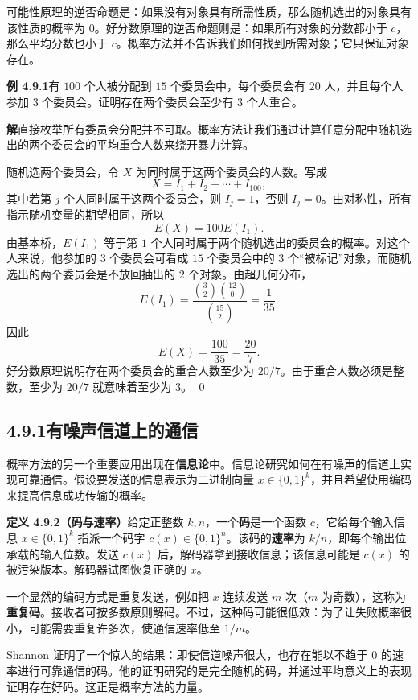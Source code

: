 \documentclass[UTF8,12pt,a4paper,fontset=fandol]{ctexart}
\begin{document}
可能性原理的逆否命题是：如果没有对象具有所需性质，那么随机选出的对象具有该性质的概率为 $0$。好分数原理的逆否命题则是：如果所有对象的分数都小于 $c$，那么平均分数也小于 $c$。概率方法并不告诉我们如何找到所需对象；它只保证对象存在。

\noindent\textbf{例 4.9.1}\quad 有 $100$ 个人被分配到 $15$ 个委员会中，每个委员会有 $20$ 人，并且每个人参加 $3$ 个委员会。证明存在两个委员会至少有 $3$ 个人重合。

\noindent\textbf{解}\quad 直接枚举所有委员会分配并不可取。概率方法让我们通过计算任意分配中随机选出的两个委员会的平均重合人数来绕开暴力计算。

随机选两个委员会，令 $X$ 为同时属于这两个委员会的人数。写成
\[
  X=I_1+I_2+\cdots+I_{100},
\]
其中若第 $j$ 个人同时属于这两个委员会，则 $I_j=1$，否则 $I_j=0$。由对称性，所有指示随机变量的期望相同，所以
\[
  E(X)=100E(I_1).
\]
由基本桥，$E(I_1)$ 等于第 $1$ 个人同时属于两个随机选出的委员会的概率。对这个人来说，他参加的 $3$ 个委员会可看成 $15$ 个委员会中的 $3$ 个“被标记”对象，而随机选出的两个委员会是不放回抽出的 $2$ 个对象。由超几何分布，
\[
  E(I_1)=\frac{\binom{3}{2}\binom{12}{0}}{\binom{15}{2}}=\frac{1}{35}.
\]
因此
\[
  E(X)=\frac{100}{35}=\frac{20}{7}.
\]
好分数原理说明存在两个委员会的重合人数至少为 $20/7$。由于重合人数必须是整数，至少为 $20/7$ 就意味着至少为 $3$。 \qed

\subsection*{4.9.1\quad 有噪声信道上的通信}

概率方法的另一个重要应用出现在\textbf{信息论}中。信息论研究如何在有噪声的信道上实现可靠通信。假设要发送的信息表示为二进制向量 $x\in\{0,1\}^k$，并且希望使用编码来提高信息成功传输的概率。

\noindent\textbf{定义 4.9.2（码与速率）}\quad 给定正整数 $k,n$，一个\textbf{码}是一个函数 $c$，它给每个输入信息 $x\in\{0,1\}^k$ 指派一个码字 $c(x)\in\{0,1\}^n$。该码的\textbf{速率}为 $k/n$，即每个输出位承载的输入位数。发送 $c(x)$ 后，解码器拿到接收信息；该信息可能是 $c(x)$ 的被污染版本。解码器试图恢复正确的 $x$。

一个显然的编码方式是重复发送，例如把 $x$ 连续发送 $m$ 次（$m$ 为奇数），这称为\textbf{重复码}。接收者可按多数原则解码。不过，这种码可能很低效：为了让失败概率很小，可能需要重复许多次，使通信速率低至 $1/m$。

Shannon 证明了一个惊人的结果：即使信道噪声很大，也存在能以不趋于 $0$ 的速率进行可靠通信的码。他的证明研究的是完全随机的码，并通过平均意义上的表现证明存在好码。这正是概率方法的力量。
\end{document}
